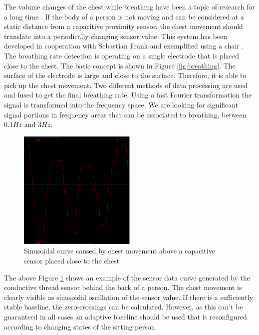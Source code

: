 The volume changes of the chest while breathing have been a topic of research for a long time \cite{wade1954movements}. If the body of a person is not moving and can be considered at a static distance from a capacitive proximity sensor, the chest movement should translate into a periodically changing sensor value. This system has been developed in cooperation with Sebastian Frank and exemplified using a chair \cite{Braun2013ChairAid}. The breathing rate detection is operating on a single electrode that is placed close to the chest. The basic concept is shown in Figure \ref{fig:breathing}. The surface of the electrode is large and close to the surface. Therefore, it is able to pick up the chest movement. Two different methods of data processing are used and fused to get the final breathing rate. Using a fast Fourier transformation the signal is transformed into the frequency space. We are looking for significant signal portions in frequency areas that can be associated to breathing, between $0.1Hz$ and $3Hz$. 

\begin{figure}[ht]
\centering
\includegraphics[width=0.5\textwidth]{images/smartchair_breathing_curve}
\caption{Sinusoidal curve caused by chest movement above a capacitive sensor placed close to the chest}
\label{fig:smartchair_breathing_curve}
\end{figure}

The above Figure \ref{fig:smartchair_breathing_curve} shows an example of the sensor data curve generated by the conductive thread sensor behind the back of a person. The chest movement is clearly visible as sinusoidal oscillation of the sensor value. If there is a sufficiently stable baseline, the zero-crossings can be calculated. However, as this can't be guaranteed in all cases an adaptive baseline should be used that is reconfigured according to changing states of the sitting person. 

